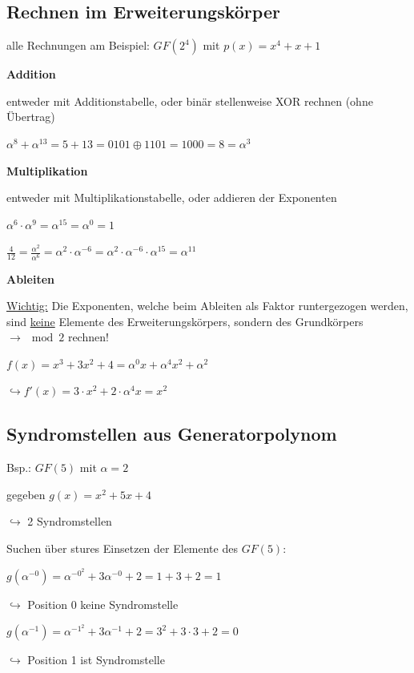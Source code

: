 \subsection{Rechnen im Erweiterungskörper}
\label{subsec:apendix-erweiterungskoerper}

alle Rechnungen am Beispiel: $GF(2^4)$ mit $p(x) = x^4 + x + 1$

\textbf{Addition}

entweder mit Additionstabelle, oder binär stellenweise XOR rechnen (ohne Übertrag)

$\displaystyle{
    \alpha^8 + \alpha^{13} = 5 + 13 = 0101 \oplus 1101 = 1000 = 8 = \alpha^3
}$

\textbf{Multiplikation}

entweder mit Multiplikationstabelle, oder addieren der Exponenten
 
$\displaystyle{
    \alpha^6 \cdot \alpha^9 = \alpha^{15} = \alpha^0 = 1
}$

$\displaystyle{
    \frac{4}{12} = \frac{\alpha^2}{\alpha^6} = \alpha^2 \cdot \alpha^{-6} = \alpha^2 \cdot \alpha^{-6} \cdot \alpha^{15} = \alpha^{11}
}$

\textbf{Ableiten}

\underline{Wichtig:} Die Exponenten, welche beim Ableiten als Faktor runtergezogen werden, sind
\underline{keine} Elemente des Erweiterungskörpers, sondern des Grundkörpers $\rightarrow \mod 2$ rechnen!
 
$f(x) = x^3 + 3x^2 + 4 = \alpha^0 x + \alpha^4 x^2 + \alpha^2$

$\hookrightarrow f'(x) = 3 \cdot x^2 + 2 \cdot \alpha^4 x = x^2$

\subsection{Syndromstellen aus Generatorpolynom}

Bsp.: $GF(5)$ mit $\alpha = 2$

gegeben $g(x) = x^2 + 5x + 4$

$\hookrightarrow$ 2 Syndromstellen

Suchen über stures Einsetzen der Elemente des $GF(5)$:

$g(\alpha^{-0}) = \alpha^{-0^2} + 3\alpha^{-0} + 2 = 1 + 3 + 2 = 1$

$\hookrightarrow$ Position 0 keine Syndromstelle 

$g(\alpha^{-1}) = \alpha^{-1^2} + 3 \alpha^{-1} + 2 = 3^2 + 3 \cdot 3 + 2 = 0$

$\hookrightarrow$ Position 1 ist Syndromstelle

